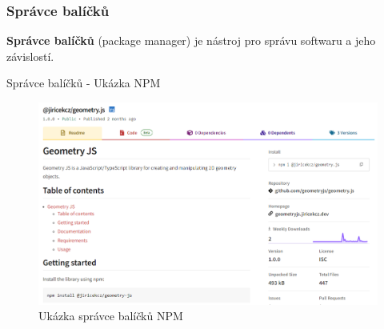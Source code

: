 \begin{frame}
    \frametitle{Správce balíčků}
    \begin{definition}
        \textbf{Správce balíčků} (package manager) je nástroj pro správu softwaru a jeho závislostí.\cite{wikipedia:správce_balíčků}
    \end{definition}
\end{frame}

\begin{frame}{Správce balíčků - Ukázka NPM}
    \begin{figure}
        \centering
        \includegraphics[height=0.718\textheight]{../resources/npm.png}
        \caption{Ukázka správce balíčků NPM}
    \end{figure}
\end{frame}